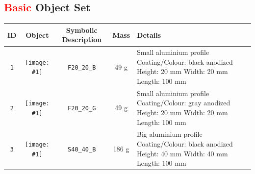 




\subsection{\textcolor{red}{Basic} Object Set}


\newcommand{\imageView}[1]{\texttt{[image: \#1]}}
{
\newcommand{\rowpadding}{0.4cm}
\setlength\extrarowheight{\rowpadding}
\begin{table}[p]

\begin{tabular}{|c|c|c|c|m{8cm}|}
\hline
ID & Object & Symbolic Description & Mass & Details \\
\hline

\texttt{1} & \imageView{./images/F20_20_B.jpg} & \texttt{F20\_20\_B} & 49 g & Small aluminium profile \newline
 Coating/Colour: black anodized\newline
 Height: 20 mm \newline
 Width: 20 mm \newline
 Length: 100 mm \\ [\rowpadding]
\hline

\texttt{2} & \imageView{./images/F20_20_G.jpg} & \texttt{F20\_20\_G} & 49 g & Small aluminium profile \newline
 Coating/Colour: gray anodized\newline
 Height: 20 mm \newline
 Width: 20 mm \newline
 Length: 100 mm \\ [\rowpadding]
\hline

\texttt{3} & \imageView{./images/S40_40_B.jpg} & \texttt{S40\_40\_B} & 186 g & Big aluminium profile\newline
 Coating/Colour: black anodized\newline
 Height: 40 mm \newline
 Width: 40 mm \newline
 Length: 100 mm \\ [\rowpadding]
\hline


\end{tabular}
\end{table}}
